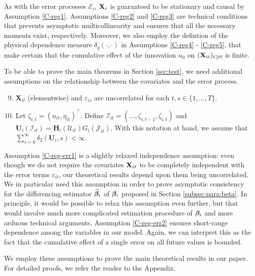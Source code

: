 \documentclass[a4paper,12pt]{article}
\begin{document}
As with the error processes $\mathcal{E}_i$, $\mathbf{X}_i$ is guaranteed to be stationary and causal by Assumption \ref{C-reg1}. Assumptions \ref{C-reg2} and \ref{C-reg3} are technical conditions that prevents asymptotic multicollinearity and ensures that all the necessary moments exist, respectively. Moreover, we also employ the defintion of the physical dependence measure $ \delta_{q}(\cdot, \cdot)$ in Assumptions \ref{C-reg4} - \ref{C-reg5}, that make certain that the cumulative effect of the innovation $u_0$ on $(\mathbf{X}_{it})_{t\geq 0}$ is finite. 



To be able to prove the main theorems in Section \ref{sec:test}, we need additional assumptions on the relationship between the covariates and the error process.

\begin{enumerate}[label=(C\arabic*),leftmargin=1.05cm]
\setcounter{enumi}{8}
\item \label{C-reg-err1} $\mathbf{X}_{it}$ (elementwise) and $\varepsilon_{is}$ are uncorrelated for each $t, s\in \{1, \ldots, T\}$.
\item \label{C-reg-err2} Let $\zeta_{i, t} = (u_{it}, \eta_{it})^\top$. Define $\mathcal{I}_{it} = (\ldots, \zeta_{i, t-1}, \zeta_{i, t})$ and $\mathbf{U}_i(\mathcal{I}_{it}) =  \mathbf{H}_i(\mathcal{U}_{it})G_i(\mathcal{J}_{it})$. With this notation at hand, we assume that $\sum_{s=0}^\infty \delta_2(\mathbf{U}_i, s)<\infty$.

\end{enumerate}
Assumption \ref{C-reg-err1} is a slightly relaxed independence assumption: even though we do not require the covariates $\mathbf{X}_{it}$ to be completely independent with the error terms $\varepsilon_{it}$, our theoretical results depend upon them being uncorrelated. We in particular need this assumption in order to prove asymptotic consistency for the differencing estimator $\widehat{\bm{\beta}}_i$ of $\bm{\beta}_i$ proposed in Section \ref{subsec:para:beta}. In principle, it would be possible to relax this assumption even further, but that would involve much more complicated estimation procedure of $\bm{\beta}_i$ and more arduous technical arguments. Assumption \ref{C-reg-err2} ensures short-range dependence among the variables in our model. Again, we can interpret this as the fact that the cumulative effect of a single error on all future values is bounded.

We employ these assumptions to prove the main theoretical results in our paper. For detailed proofs, we refer the reader to the Appendix.
\end{document}
